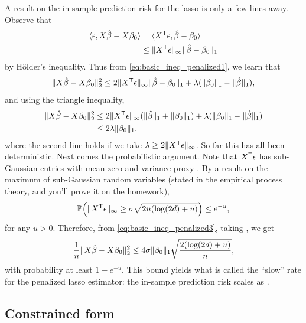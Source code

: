 \documentclass{article}
\begin{document}
A result on the in-sample prediction risk for the lasso is only a few lines
away. Observe that
\begin{align*}
\langle \epsilon, X\hat{\beta} - X\beta_0 \rangle 
&= \langle X^{\mathsf{T}} \epsilon, \hat{\beta} - \beta_0 \rangle \\
&\leq \|X^{\mathsf{T}} \epsilon\|_\infty \|\hat{\beta} - \beta_0\|_1 
\end{align*}
by H{\"o}lder's inequality. Thus from \eqref{eq:basic_ineq_penalized1}, we learn
that 
\begin{equation}
\label{eq:basic_ineq_penalized2}
\|X\hat{\beta} - X\beta_0\|_2^2 \leq 2 \|X^{\mathsf{T}} \epsilon\|_\infty \|\hat{\beta} -
\beta_0\|_1 + \lambda (\|\beta_0\|_1 - \|\hat{\beta}\|_1), 
\end{equation}
and using the triangle inequality, 
\begin{align}
\nonumber
\|X\hat{\beta} - X\beta_0\|_2^2 
&\leq 2 \|X^{\mathsf{T}} \epsilon\|_\infty (\|\hat{\beta}\|_1 + \|\beta_0\|_1) +
  \lambda (\|\beta_0\|_1 - \|\hat{\beta}\|_1) \\
\label{eq:basic_ineq_penalized3}
&\leq 2 \lambda \|\beta_0\|_1.
\end{align}
where the second line holds if we take $\lambda \geq 2\|X^{\mathsf{T}} \epsilon\|_\infty$.    
So far this has all been deterministic. Next comes the probabilistic 
argument. Note that $X^{\mathsf{T}} \epsilon$ has sub-Gaussian entries with mean zero and
variance proxy . By a result on the maximum of sub-Gaussian random variables
(stated in the empirical process theory, and you'll prove it on the homework), 
\[
\mathbb{P} \Big(\|X^{\mathsf{T}} \epsilon\|_\infty \geq \sigma \sqrt{2n (\log(2d) + u)} \Big) \leq 
e^{-u}, 
\]
for any $u>0$. Therefore, from \eqref{eq:basic_ineq_penalized3}, taking
, we get 
\begin{equation}
\label{eq:lasso_risk_penalized}
\frac{1}{n} \|X\hat{\beta} - X\beta_0\|_2^2 \leq 4 \sigma \|\beta_0\|_1 
  \sqrt{\frac{2 (\log(2d) + u)}{n}},
\end{equation}
with probability at least $1-e^{-u}$. This bound yields what is called the
``slow'' rate for the penalized lasso estimator: the in-sample prediction risk
scales as .

\subsection{Constrained form}
\end{document}
